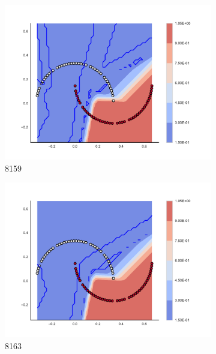 \begin{figure}[h]
\begin{subfigure}[b]{0.09\textwidth}
    \includegraphics[clip, trim=2.35cm 1.75cm 4.5cm 0cm,width=\textwidth]{img/convergence/8159.pdf}
    \caption{8159}
    \label{fig:convergence_8159}
\end{subfigure}
%
\begin{subfigure}[b]{0.09\textwidth}
    \includegraphics[clip, trim=2.35cm 1.75cm 4.5cm 0cm,width=\textwidth]{img/convergence/8163.pdf}
    \caption{8163}
    \label{fig:convergence_8163}
\end{subfigure}
%
\begin{subfigure}[b]{0.09\textwidth}

\end{subfigure}
\end{figure}
